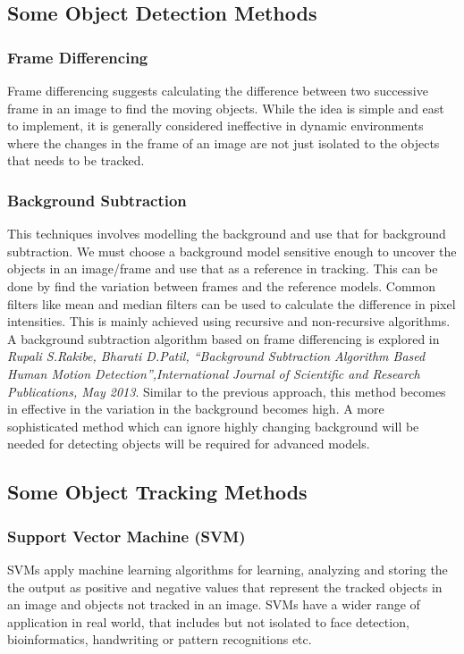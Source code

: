 \documentclass[10pt,twocolumn,letterpaper]{article}
\begin{document}
\subsection{Some Object Detection Methods}

\subsubsection{Frame Differencing}
Frame differencing suggests calculating the difference between two successive frame in an image to find the moving objects. While the idea is simple and east to implement, it is generally considered ineffective in dynamic environments where the changes in the frame of an image are not just isolated to the objects that needs to be tracked.

\subsubsection{Background Subtraction}
This techniques involves modelling the background and use that for background subtraction. We must choose a background model sensitive enough to uncover the objects in an image/frame and use that as a reference in tracking. This can be done by find the variation between frames and the reference models. Common filters like mean and median filters can be used to calculate the difference in pixel intensities. This is mainly achieved using recursive and non-recursive algorithms. A background subtraction algorithm based on frame differencing is explored in \textit{Rupali S.Rakibe, Bharati D.Patil, “Background Subtraction Algorithm Based Human Motion Detection”,International Journal of Scientific and Research Publications, May 2013}.  Similar to the previous approach, this method becomes in effective in the variation in the background becomes high. A more sophisticated method which can ignore highly changing  background will be needed for detecting objects will be required for advanced models.

\subsection{Some Object Tracking Methods}

\subsubsection{Support Vector Machine (SVM)}
SVMs apply machine learning algorithms for learning, analyzing and storing the the output as positive and negative values that represent the tracked objects in an image and objects not tracked in an image. SVMs have a wider range of application in real world, that includes but not isolated to face detection, bioinformatics, handwriting or pattern recognitions etc.
\end{document}
